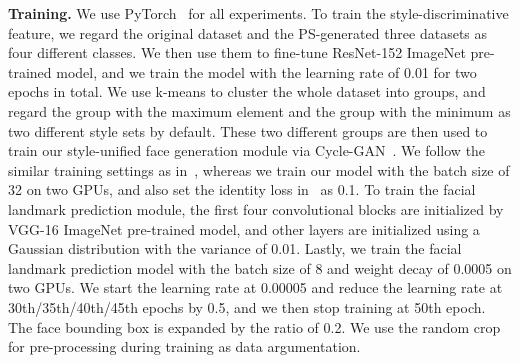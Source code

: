 \documentclass[10pt,twocolumn,letterpaper]{article}
\begin{document}
\textbf{Training.}
We use PyTorch~\cite{paszke2017automatic} for all experiments.
To train the style-discriminative feature, we regard the original dataset and the PS-generated three datasets as four different classes.
We then use them to fine-tune ResNet-152 ImageNet pre-trained model, and we train the model with the learning rate of 0.01 for two epochs in total.
We use k-means to cluster the whole dataset into  groups, and regard the group with the maximum element and the group with the minimum as two different style sets by default.
These two different groups are then used to train our style-unified face generation module via Cycle-GAN~\cite{CycleGAN2017}.
We follow the similar training settings as in~\cite{CycleGAN2017}, whereas we train our model with the batch size of 32 on two GPUs, and also set the identity loss in~\cite{CycleGAN2017} as 0.1.
To train the facial landmark prediction module, the first four convolutional blocks are initialized by VGG-16 ImageNet pre-trained model, and other layers are initialized using a Gaussian distribution with the variance of 0.01.
Lastly, we train the facial landmark prediction model with the batch size of 8 and weight decay of 0.0005 on two GPUs.
We start the learning rate at 0.00005 and reduce the learning rate at 30th/35th/40th/45th epochs by 0.5, and we then stop training at 50th epoch.
The face bounding box is expanded by the ratio of 0.2.
We use the random crop for pre-processing during training as data argumentation.
\end{document}
